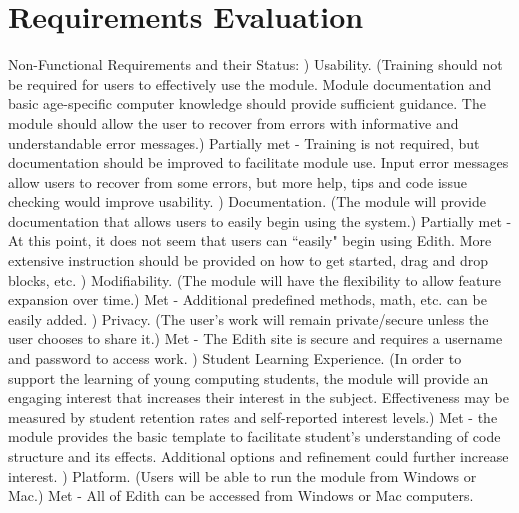 \documentclass[a4paper]{article}
\begin{document}
\section{Requirements Evaluation}
Non-Functional Requirements and their Status: \newline {}) Usability. (Training should not be required for users to effectively use the module. 
Module documentation and basic age-specific computer knowledge should provide sufficient guidance.
The module should allow the user to recover from errors with informative and understandable error messages.) Partially met - Training is not required, but documentation should be improved to facilitate module use. Input error messages allow users to recover from some errors, but more help, tips and code issue checking would improve usability. \newline {}) Documentation. (The module will provide documentation that allows users to easily begin using the system.) Partially met - At this point, it does not seem that users can ``easily" begin using Edith. More extensive instruction should be provided on how to get started, drag and drop blocks, etc. \newline {}) Modifiability. (The module will have the flexibility to allow feature expansion over time.) Met - Additional predefined methods, math, etc. can be easily added. \newline {}) Privacy. (The user's work will remain private/secure unless the user chooses to share it.) Met - The Edith site is secure and requires a username and password to access work. \newline {}) Student Learning Experience. (In order to support the learning of young computing students, the module will provide an engaging interest that increases their interest in the subject. Effectiveness may be measured by student retention rates and self-reported interest levels.) Met - the module provides the basic template to facilitate student's understanding of code structure and its effects. Additional options and refinement could further increase interest. \newline {}) Platform. (Users will be able to run the module from Windows or Mac.) Met - All of Edith can be accessed from Windows or Mac computers. \newline \newline 
\end{document}
